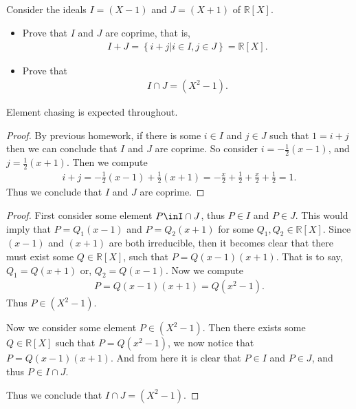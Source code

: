 \documentclass[10pt]{armath}
\newcommand{\R}{\mathbb{R}}
\newenvironment{claim}[1]{\par\noindent\textit{Claim:}\space#1}{}
\begin{document}
\subsection{}%
\label{sub:3b}

Consider the ideals $I=(X-1)$ and $J=(X+1)$ of $\R[X]$.
\begin{itemize}
  \item Prove that $I$ and $J$ are coprime, that is,
    \begin{align*}
      I+J=\left\{i+j\vert i\in I,j\in J\right\}=\R[X].
    \end{align*}
  \item Prove that
    \begin{align*}
      I\cap J=(X^2-1).
    \end{align*}
\end{itemize}
Element chasing is expected throughout.

\begin{proof}
  By previous homework, if there is some $i\in I$ and $j\in J$ such that
  $1=i+j$ then we can conclude that $I$ and $J$ are coprime. So consider
  $i=-\frac{1}{2}(x-1)$, and $j=\frac{1}{2}(x+1)$. Then we compute
  \begin{align*}
    i+j=-\frac{1}{2}(x-1)+\frac{1}{2}(x+1)=-\frac{x}{2}+\frac{1}{2}+\frac{x}{2}+\frac{1}{2}=1.
  \end{align*}
  Thus we conclude that $I$ and $J$ are coprime.
\end{proof}

\begin{proof}
   First consider some element $P\inI\cap J$, thus $P\in I$ and $P\in J$. This
   would imply that $P=Q_1(x-1)$ and $P=Q_2(x+1)$ for some $Q_1,Q_2\in\R[X]$.
   Since $(x-1)$ and $(x+1)$ are both irreducible, then it becomes clear that
   there must exist some $Q\in\R[X]$, such that $P=Q(x-1)(x+1)$. That is to
   say, $Q_1=Q(x+1)$ or, $Q_2=Q(x-1)$. Now we compute
   \begin{align*}
      P=Q(x-1)(x+1)=Q(x^2-1).
   \end{align*}
   Thus $P\in\left(X^2-1\right)$.

   Now we consider some element $P\in\left(X^2-1\right)$. Then there exists
   some $Q\in\R[X]$ such that $P=Q(x^2-1)$, we now notice that $P=Q(x-1)(x+1)$.
   And from here it is clear that $P\in I$ and $P\in J$, and thus $P\in I\cap
   J$.

   Thus we conclude that $I\cap J=\left(X^2-1\right)$.
\end{proof}
\end{document}
